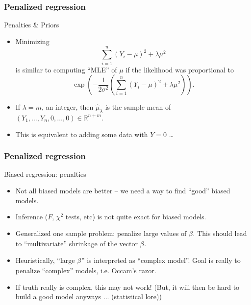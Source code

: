 \documentclass[handout]{beamer}
\newcommand{\B}[1]{\beta_{#1}}
\begin{document}
   \begin{frame} \frametitle{Penalized regression}

   \begin{block}
     {Penalties \& Priors}
     \begin{itemize}
     \item Minimizing
   $$
   \sum_{i=1}^n (Y_i - \mu)^2 + \lambda \mu^2$$
   is similar to computing ``MLE'' of $\mu$ if the likelihood
   was proportional to
   $$
   \exp \left(-\frac{1}{2\sigma^2}\left( \sum_{i=1}^n (Y_i - \mu)^2 + \lambda \mu^2\right) \right).
   $$


   \item If $\lambda=m$, an integer, then $\widehat{\mu}_{\lambda}$ is the sample
   mean of $(Y_1, \dots, Y_n,0 ,\dots, 0) \in \mathbb{R}^{n+m}$.
   \item This is equivalent to adding some data with $Y=0$ \dots

     \end{itemize}

   \end{block}
   \end{frame}


   \begin{frame} \frametitle{Penalized regression}

   \begin{block}
   {Biased regression: penalties                     }
       \begin{itemize}[<+->]

       \item Not all biased models are better -- we need a way to find ``good'' biased models.

       \item Inference ($F$, $\chi^2$ tests, etc) is not quite exact for  biased models.

       \item Generalized one sample problem: penalize large values of $\B{}$.
       This should lead to ``multivariate'' shrinkage of the vector  $\B{}$.
       \item Heuristically, ``large $\B{}$'' is interpreted as ``complex model''. Goal is really to penalize ``complex'' models, i.e. Occam's razor.

       \item If truth  really is complex, this may not work! (But, it will then be hard to build a good model anyways ... (statistical lore))

       \end{itemize}

   \end{block}
   \end{frame}
\end{document}

